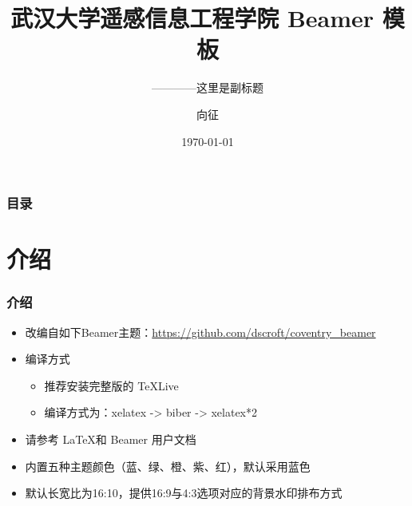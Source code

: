 \documentclass[presentation,aspectratio=1610]{beamer}
\title[WHURS]{武汉大学遥感信息工程学院 Beamer 模板} %
\subtitle{————这里是副标题}
\author{向征} %
\institute[WHU] %
{
武汉大学遥感信息工程学院 \\ %
\medskip
\textit{hspili@live.com} %
}
\date{\today} %
\begin{document}
\begin{frame}
\titlepage %
\end{frame}

\begin{frame}
\frametitle{目录} %
\tableofcontents %
\end{frame}


\section{介绍} %


\begin{frame}
\frametitle{介绍}
	\begin{itemize}
	\item 改编自如下Beamer主题：\url{https://github.com/dscroft/coventry_beamer}
    \item {编译方式}
	    \begin{itemize}
	    	\item 推荐安装完整版的 TeXLive
	    	\item 编译方式为：xelatex -> biber -> xelatex*2
	    \end{itemize}
    \item 请参考 \LaTeX 和 Beamer 用户文档 
    \item 内置五种主题颜色（蓝、绿、橙、紫、红），默认采用蓝色
    \item 默认长宽比为16:10，提供16:9与4:3选项对应的背景水印排布方式
  \end{itemize}
\end{frame}
\end{document}
